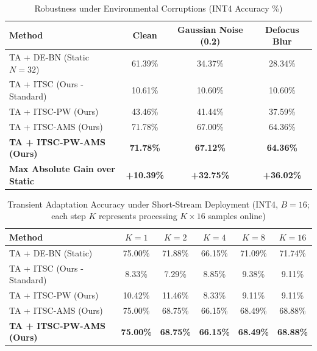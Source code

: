 \documentclass{article}
\theoremstyle{plain}
\theoremstyle{definition}
\theoremstyle{remark}
\begin{document}
\begin{table}[t]
  \caption{Robustness under Environmental Corruptions (INT4 Accuracy \%)}
  \label{tab:corrupt_results}
  \centering
  \begin{tabular}{lccc}
    \toprule
    \textbf{Method} & \textbf{Clean} & \textbf{Gaussian Noise (0.2)} & \textbf{Defocus Blur} \\
    \midrule
    TA + DE-BN (Static $N=32$) & 61.39\% & 34.37\% & 28.34\% \\
    \midrule
    TA + ITSC (Ours - Standard) & 10.61\% & 10.60\% & 10.60\% \\
    TA + ITSC-PW (Ours) & 43.46\% & 41.44\% & 37.59\% \\
    TA + ITSC-AMS (Ours) & 71.78\% & 67.00\% & 64.36\% \\
    \textbf{TA + ITSC-PW-AMS (Ours)} & \textbf{71.78\%} & \textbf{67.12\%} & \textbf{64.36\%} \\
    \midrule
    \textbf{Max Absolute Gain over Static} & \textbf{+10.39\%} & \textbf{+32.75\%} & \textbf{+36.02\%} \\
    \bottomrule
  \end{tabular}
\end{table}

\begin{table}[t]
  \caption{Transient Adaptation Accuracy under Short-Stream Deployment (INT4, $B=16$; each step $K$ represents processing $K \times 16$ samples online)}
  \label{tab:transient_results}
  \centering
  \begin{tabular}{lccccc}
    \toprule
    \textbf{Method} & \textbf{$K=1$} & \textbf{$K=2$} & \textbf{$K=4$} & \textbf{$K=8$} & \textbf{$K=16$} \\
    \midrule
    TA + DE-BN (Static) & 75.00\% & 71.88\% & 66.15\% & 71.09\% & 71.74\% \\
    \midrule
    TA + ITSC (Ours - Standard) & 8.33\% & 7.29\% & 8.85\% & 9.38\% & 9.11\% \\
    TA + ITSC-PW (Ours) & 10.42\% & 11.46\% & 8.33\% & 9.11\% & 9.11\% \\
    TA + ITSC-AMS (Ours) & 75.00\% & 68.75\% & 66.15\% & 68.49\% & 68.88\% \\
    \textbf{TA + ITSC-PW-AMS (Ours)} & \textbf{75.00\%} & \textbf{68.75\%} & \textbf{66.15\%} & \textbf{68.49\%} & \textbf{68.88\%} \\
    \bottomrule
  \end{tabular}
\end{table}
\end{document}
